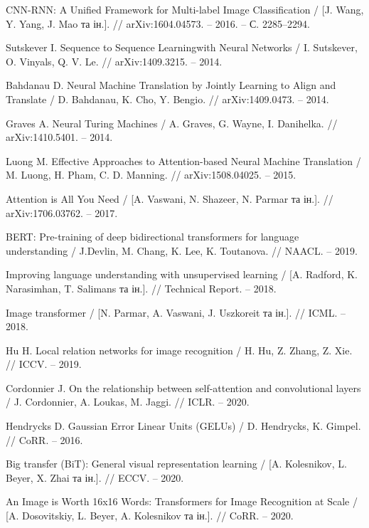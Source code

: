 \begin{thebibliography}{9}
    CNN-RNN: A Unified Framework for Multi-label Image Classification / [J. Wang, Y. Yang, J. Mao та ін.]. // arXiv:1604.04573. – 2016. – С. 2285–2294.

    Sutskever I. Sequence to Sequence Learningwith Neural Networks / I. Sutskever, O. Vinyals, Q. V. Le. // arXiv:1409.3215. – 2014.

    Bahdanau D. Neural Machine Translation by Jointly Learning to Align and Translate / D. Bahdanau, K. Cho, Y. Bengio. // arXiv:1409.0473. – 2014.

    Graves A. Neural Turing Machines / A. Graves, G. Wayne, I. Danihelka. // arXiv:1410.5401. – 2014.

    Luong M. Effective Approaches to Attention-based Neural Machine Translation / M. Luong, H. Pham, C. D. Manning. // arXiv:1508.04025. – 2015.

    Attention is All You Need / [A. Vaswani, N. Shazeer, N. Parmar та ін.]. // arXiv:1706.03762. – 2017.

    BERT: Pre-training of deep bidirectional transformers for language understanding / J.Devlin, M. Chang, K. Lee, K. Toutanova. // NAACL. – 2019.

    Improving language understanding with unsupervised learning / [A. Radford, K. Narasimhan, T. Salimans та ін.]. // Technical Report. – 2018.

    Image transformer / [N. Parmar, A. Vaswani, J. Uszkoreit та ін.]. // ICML. – 2018.

    Hu H. Local relation networks for image recognition / H. Hu, Z. Zhang, Z. Xie. // ICCV. – 2019.

    Cordonnier J. On the relationship between self-attention and convolutional layers / J. Cordonnier, A. Loukas, M. Jaggi. // ICLR. – 2020.

    Hendrycks D. Gaussian Error Linear Units (GELUs) / D. Hendrycks, K. Gimpel. // CoRR. – 2016.

    Big transfer (BiT): General visual representation learning / [A. Kolesnikov, L. Beyer, X. Zhai та ін.]. // ECCV. – 2020.

    An Image is Worth 16x16 Words: Transformers for Image Recognition at Scale / [A. Dosovitskiy, L. Beyer, A. Kolesnikov та ін.]. // CoRR. – 2020.

\end{thebibliography}